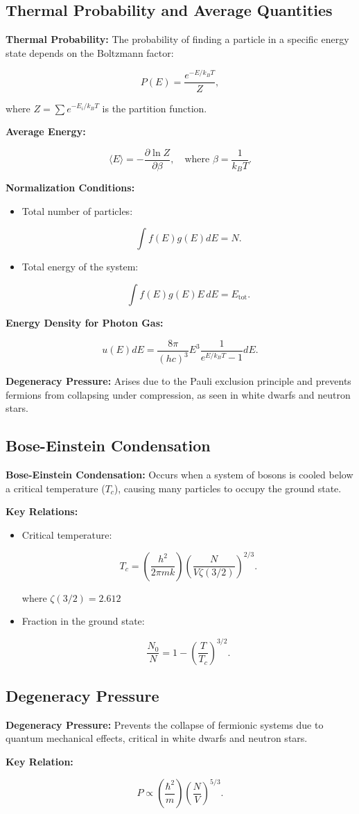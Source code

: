\documentclass{article}
\newcommand{\eqbox}[1]{\begin{tcolorbox}[colback=gray!10] #1 \end{tcolorbox}}
\newcommand{\conceptbox}[1]{\begin{tcolorbox}[colback=blue!10] #1 \end{tcolorbox}}
\begin{document}
\subsection{Thermal Probability and Average Quantities}
\conceptbox{
\textbf{Thermal Probability:}
The probability of finding a particle in a specific energy state depends on the Boltzmann factor:
\eqbox{
\[
P(E) = \frac{e^{-E/k_BT}}{Z},
\]
}
where \( Z = \sum e^{-E_i/k_BT} \) is the partition function.

\textbf{Average Energy:}
\eqbox{
\[
\langle E \rangle = -\frac{\partial \ln Z}{\partial \beta}, \quad \text{where } \beta = \frac{1}{k_BT}.
\]
}

\textbf{Normalization Conditions:}
\begin{itemize}
    \item Total number of particles:
    \eqbox{
    \[
    \int f(E)g(E)dE = N.
    \]
    }
    \item Total energy of the system:
    \eqbox{
    \[
    \int f(E)g(E)E\,dE = E_{\text{tot}}.
    \]
    }
\end{itemize}

\textbf{Energy Density for Photon Gas:}
\eqbox{
\[
u(E)dE = \frac{8\pi}{(hc)^3} E^3 \frac{1}{e^{E/k_BT} - 1} dE.
\]
}

\textbf{Degeneracy Pressure:}
Arises due to the Pauli exclusion principle and prevents fermions from collapsing under compression, as seen in white dwarfs and neutron stars.
}

\subsection{Bose-Einstein Condensation}
\conceptbox{
\textbf{Bose-Einstein Condensation:}
Occurs when a system of bosons is cooled below a critical temperature (\( T_c \)), causing many particles to occupy the ground state.

\textbf{Key Relations:}
\begin{itemize}
    \item Critical temperature:
    \eqbox{
    \[
    T_c = \left(\frac{h^2}{2\pi mk}\right) \left(\frac{N}{V\zeta(3/2)}\right)^{2/3}.
    \]
    }
    where \(\zeta(3/2) = 2.612\)
    \item Fraction in the ground state:
    \eqbox{
    \[
    \frac{N_0}{N} = 1 - \left(\frac{T}{T_c}\right)^{3/2}.
    \]
    }
\end{itemize}
}

\subsection{Degeneracy Pressure}
\conceptbox{
\textbf{Degeneracy Pressure:}
Prevents the collapse of fermionic systems due to quantum mechanical effects, critical in white dwarfs and neutron stars.

\textbf{Key Relation:}
\eqbox{
\[
P \propto \left(\frac{\hbar^2}{m}\right)\left(\frac{N}{V}\right)^{5/3}.
\]
}
}
\end{document}

